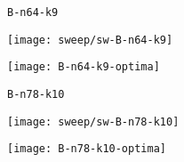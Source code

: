 \begin{figure}[H]
	\begin{minipage}{0.15\textwidth}
		\centering
		\texttt{B-n64-k9}
	\end{minipage}%
	\begin{minipage}{0.40\textwidth}
		\centering
		\texttt{[image: sweep/sw-B-n64-k9]}\par
	\end{minipage}%
	\hspace{0.03\textwidth}
	\begin{minipage}{0.40\textwidth}
		\centering
		\texttt{[image: B-n64-k9-optima]}\par
	\end{minipage}%
\end{figure}

\begin{figure}[H]
	\begin{minipage}{0.15\textwidth}
		\centering
		\texttt{B-n78-k10}
	\end{minipage}%
	\begin{minipage}{0.40\textwidth}
		\centering
		\texttt{[image: sweep/sw-B-n78-k10]}\par
	\end{minipage}%
	\hspace{0.03\textwidth}
	\begin{minipage}{0.40\textwidth}
		\centering
		\texttt{[image: B-n78-k10-optima]}\par
	\end{minipage}%
\end{figure}
